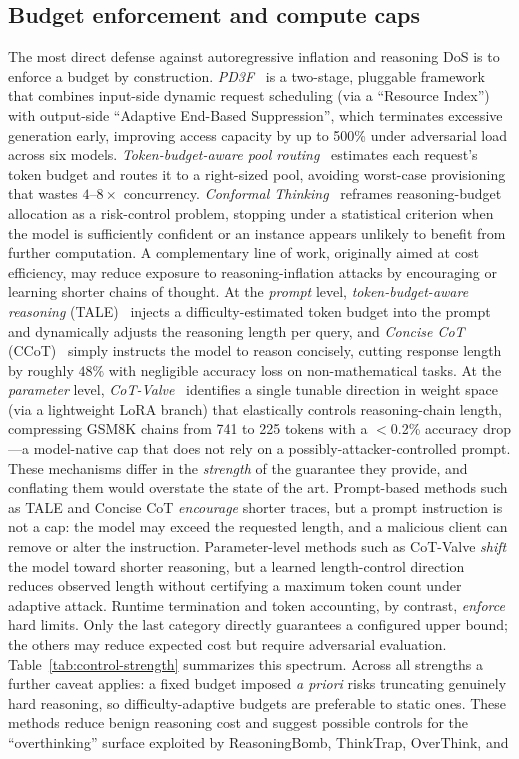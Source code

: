 \documentclass[acmsmall,screen,review,nonacm]{acmart}
\begin{document}
\subsection{Budget enforcement and compute caps}
The most direct defense against autoregressive inflation and reasoning DoS is to enforce a budget by construction. \emph{PD3F}~\cite{zhang2025pd3f} is a two-stage, pluggable framework that combines input-side dynamic request scheduling (via a ``Resource Index'') with output-side ``Adaptive End-Based Suppression'', which terminates excessive generation early, improving access capacity by up to 500\% under adversarial load across six models. \emph{Token-budget-aware pool routing}~\cite{chen2026tokenbudget} estimates each request's token budget and routes it to a right-sized pool, avoiding worst-case provisioning that wastes $4$--$8\times$ concurrency. \emph{Conformal Thinking}~\cite{wang2026conformal} reframes reasoning-budget allocation as a risk-control problem, stopping under a statistical criterion when the model is sufficiently confident or an instance appears unlikely to benefit from further computation. A complementary line of work, originally aimed at cost efficiency, may reduce exposure to reasoning-inflation attacks by encouraging or learning shorter chains of thought. At the \emph{prompt} level, \emph{token-budget-aware reasoning} (TALE)~\cite{han2024tale} injects a difficulty-estimated token budget into the prompt and dynamically adjusts the reasoning length per query, and \emph{Concise CoT} (CCoT)~\cite{renze2024ccot} simply instructs the model to reason concisely, cutting response length by roughly $48\%$ with negligible accuracy loss on non-mathematical tasks. At the \emph{parameter} level, \emph{CoT-Valve}~\cite{ma2025cotvalve} identifies a single tunable direction in weight space (via a lightweight LoRA branch) that elastically controls reasoning-chain length, compressing GSM8K chains from 741 to 225 tokens with a $<$0.2\% accuracy drop---a model-native cap that does not rely on a possibly-attacker-controlled prompt. These mechanisms differ in the \emph{strength} of the guarantee they provide, and conflating them would overstate the state of the art. Prompt-based methods such as TALE and Concise CoT \emph{encourage} shorter traces, but a prompt instruction is not a cap: the model may exceed the requested length, and a malicious client can remove or alter the instruction. Parameter-level methods such as CoT-Valve \emph{shift} the model toward shorter reasoning, but a learned length-control direction reduces observed length without certifying a maximum token count under adaptive attack. Runtime termination and token accounting, by contrast, \emph{enforce} hard limits. Only the last category directly guarantees a configured upper bound; the others may reduce expected cost but require adversarial evaluation. Table~\ref{tab:control-strength} summarizes this spectrum. Across all strengths a further caveat applies: a fixed budget imposed \emph{a priori} risks truncating genuinely hard reasoning, so difficulty-adaptive budgets are preferable to static ones. These methods reduce benign reasoning cost and suggest possible controls for the ``overthinking'' surface exploited by ReasoningBomb, ThinkTrap, OverThink, and 
\end{document}
